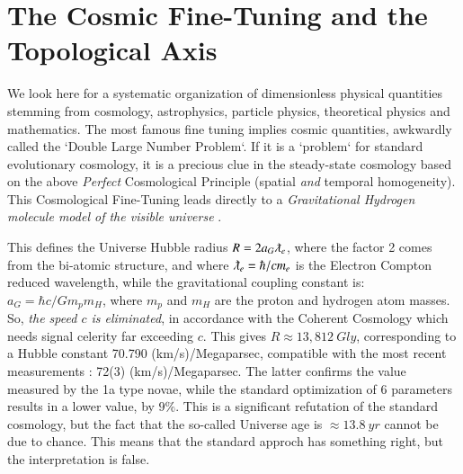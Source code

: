 \documentclass[twoside,draft]{article}
\begin{document}
\begin{sloppypar}
\section {The Cosmic Fine-Tuning and the Topological Axis}

We look here for a systematic organization of dimensionless physical quantities stemming from cosmology, astrophysics, particle   physics, theoretical physics and mathematics. The most famous fine tuning implies cosmic quantities, awkwardly called the `Double Large Number Problem`. If it is a `problem` for standard evolutionary cosmology, it is a precious clue in the steady-state cosmology based on the above \textit{Perfect} Cosmological Principle (spatial \textit{and} temporal homogeneity).
This Cosmological Fine-Tuning leads directly to a \textit{Gravitational Hydrogen molecule model of the visible universe} \cite{Sanchez1}.

This defines the Universe Hubble radius $R = 2a_{G} \lambdabar_{e}$, where the factor 2 comes from the bi-atomic structure, and where $\lambdabar_{e} = \hbar/cm_{e}$ is the Electron Compton reduced wavelength, while the gravitational coupling constant is: $a_{G} = \hbar c/Gm_{p}m_{H}$, where $m_p$ and $m_H$ are the proton and hydrogen atom masses. So, \textit{the speed $c$ is eliminated}, in accordance with the Coherent Cosmology which needs signal celerity far exceeding $c$. This gives $R \approx 13,812~Gly $, corresponding to a Hubble constant 70.790 (km/s)/Megaparsec, compatible with the most recent measurements \cite{Bonvin}: 72(3) (km/s)/Megaparsec. The latter confirms the value measured by the 1a type novae, while the standard optimization of 6 parameters results in a lower value, by $9\%$. This is a significant refutation of the standard cosmology, but the fact that the so-called Universe age is $\approx 13.8~yr$ cannot be due to chance. This means that the standard approch has something right, but the interpretation is false.


\end{sloppypar}
\end{document}
